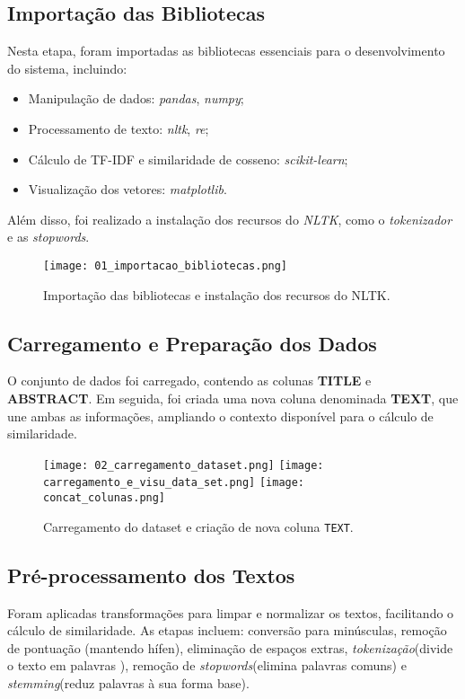 \documentclass[12pt,a4paper]{article}
\begin{document}
\subsection{Importação das Bibliotecas}
Nesta etapa, foram importadas as bibliotecas essenciais para o desenvolvimento do sistema, incluindo:
\begin{itemize}
    \item Manipulação de dados: \textit{pandas}, \textit{numpy};
    \item Processamento de texto: \textit{nltk}, \textit{re};
    \item Cálculo de TF-IDF e similaridade de cosseno: \textit{scikit-learn};
    \item Visualização dos vetores: \textit{matplotlib}.
\end{itemize}

Além disso, foi realizado a instalação dos recursos do \textit{NLTK}, como o \textit{tokenizador} e as \textit{stopwords}.

\begin{figure}[H]
    \centering
    \texttt{[image: 01\_importacao\_bibliotecas.png]}
    \caption{Importação das bibliotecas e instalação dos recursos do NLTK.}
\end{figure}

\subsection{Carregamento e Preparação dos Dados}
O conjunto de dados foi carregado, contendo as colunas \textbf{TITLE} e \textbf{ABSTRACT}. Em seguida, foi criada uma nova coluna denominada \textbf{TEXT}, que une ambas as informações, ampliando o contexto disponível para o cálculo de similaridade.

\begin{figure}[H]
    \centering
    \texttt{[image: 02\_carregamento\_dataset.png]}
    \texttt{[image: carregamento\_e\_visu\_data\_set.png]}
    \texttt{[image: concat\_colunas.png]}
    \caption{Carregamento do dataset e criação de nova coluna \texttt{TEXT}.}
\end{figure}

\subsection{Pré-processamento dos Textos}
Foram aplicadas transformações para limpar e normalizar os textos, facilitando o cálculo de similaridade. As etapas incluem: conversão para minúsculas, remoção de pontuação (mantendo hífen), eliminação de espaços extras, \textit{tokenização}(divide o texto em palavras ), remoção de \textit{stopwords}(elimina palavras comuns) e \textit{stemming}(reduz palavras à sua forma base).
\end{document}
